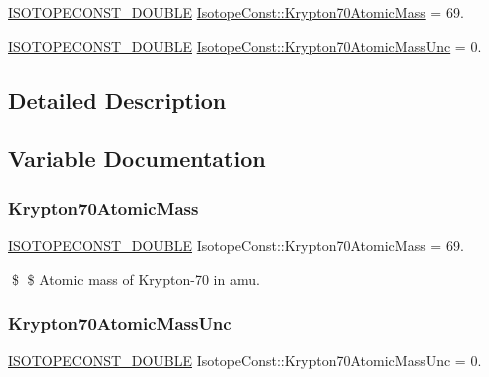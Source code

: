 \begin{DoxyCompactItemize}
\item 
\mbox{\hyperlink{group___isotope_const-_macros_ga8f45a7272ce02c0b4c65c44636ed719a}{I\+S\+O\+T\+O\+P\+E\+C\+O\+N\+S\+T\+\_\+\+D\+O\+U\+B\+LE}} \mbox{\hyperlink{group___isotope_const-_krypton-_kr70_gafeb9d350fe02e4f0672482fed9326a7e}{Isotope\+Const\+::\+Krypton70\+Atomic\+Mass}} = 69.
\item 
\mbox{\hyperlink{group___isotope_const-_macros_ga8f45a7272ce02c0b4c65c44636ed719a}{I\+S\+O\+T\+O\+P\+E\+C\+O\+N\+S\+T\+\_\+\+D\+O\+U\+B\+LE}} \mbox{\hyperlink{group___isotope_const-_krypton-_kr70_ga9838de52fe9c2660e1b197406d44956b}{Isotope\+Const\+::\+Krypton70\+Atomic\+Mass\+Unc}} = 0.
\end{DoxyCompactItemize}


\subsection{Detailed Description}


\subsection{Variable Documentation}
\mbox{\label{group___isotope_const-_krypton-_kr70_gafeb9d350fe02e4f0672482fed9326a7e}} 
\subsubsection{\texorpdfstring{Krypton70\+Atomic\+Mass}{Krypton70AtomicMass}}
{\footnotesize\ttfamily \mbox{\hyperlink{group___isotope_const-_macros_ga8f45a7272ce02c0b4c65c44636ed719a}{I\+S\+O\+T\+O\+P\+E\+C\+O\+N\+S\+T\+\_\+\+D\+O\+U\+B\+LE}} Isotope\+Const\+::\+Krypton70\+Atomic\+Mass = 69.}

\$ \$ Atomic mass of Krypton-\/70 in amu. \mbox{\label{group___isotope_const-_krypton-_kr70_ga9838de52fe9c2660e1b197406d44956b}} 
\subsubsection{\texorpdfstring{Krypton70\+Atomic\+Mass\+Unc}{Krypton70AtomicMassUnc}}
{\footnotesize\ttfamily \mbox{\hyperlink{group___isotope_const-_macros_ga8f45a7272ce02c0b4c65c44636ed719a}{I\+S\+O\+T\+O\+P\+E\+C\+O\+N\+S\+T\+\_\+\+D\+O\+U\+B\+LE}} Isotope\+Const\+::\+Krypton70\+Atomic\+Mass\+Unc = 0.}

